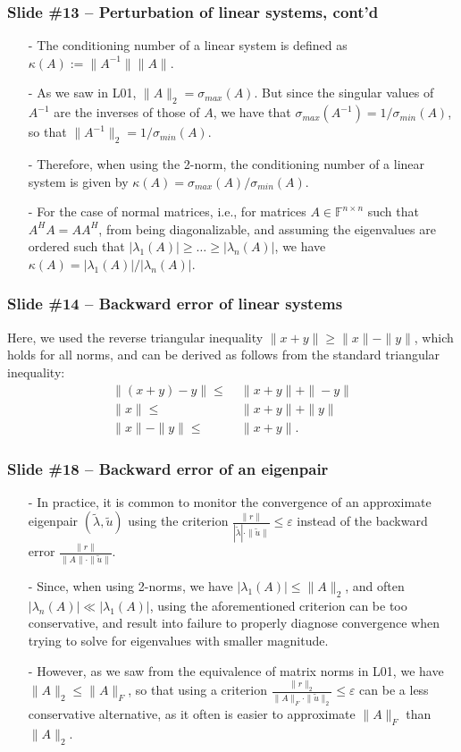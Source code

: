 \documentclass[letterpaper,10pt]{article}
\begin{document}
\subsubsection*{Slide \#13 -- Perturbation of linear systems, cont'd}
\begin{itemize}
\item[-] The conditioning number of a linear system is defined as $\kappa(A):=\|A^{-1}\|\|A\|$.
\item[-] As we saw in L01, $\|A\|_2=\sigma_{max}(A)$.
But since the singular values of $A^{-1}$ are the inverses of those of $A$, we have that $\sigma_{max}(A^{-1})=1/\sigma_{min}(A)$, so that $\|A^{-1}\|_2=1/\sigma_{min}(A)$.
\item[-] Therefore, when using the 2-norm, the conditioning number of a linear system is given by $\kappa(A)=\sigma_{max}(A)/\sigma_{min}(A)$.
\item[-] For the case of normal matrices, i.e., for matrices $A\in\mathbb{F}^{n\times n}$ such that $A^HA=AA^H$, from being diagonalizable, and assuming the eigenvalues are ordered such that $|\lambda_1(A)|\geq\dots\geq|\lambda_{n}(A)|$, we have $\kappa(A)=|\lambda_{1}(A)|/|\lambda_{n}(A)|$.
\end{itemize}

\subsubsection*{Slide \#14 -- Backward error of linear systems}
Here, we used the reverse triangular inequality $\|x+y\|\geq\|x\|-\|y\|$, which holds for all norms, and can be derived as follows from the standard triangular inequality:
\begin{align*}
\|(x+y)-y\|\leq&\;\|x+y\|+\|-y\|\\
\|x\|\leq&\;\|x+y\|+\|y\|\\
\|x\|-\|y\|\leq&\;\|x+y\|.
\end{align*}

\subsubsection*{Slide \#18 -- Backward error of an eigenpair}
\begin{itemize}
\item[-] In practice, it is common to monitor the convergence of an approximate eigenpair $(\tilde{\lambda},\tilde{u})$ using the criterion
$\displaystyle \frac{\|r\|}{|\tilde{\lambda}|\cdot\|\tilde{u}\|}\leq \varepsilon$ instead of the backward error $\displaystyle \frac{\|r\|}{\|A\|\cdot\|\tilde{u}\|}$.
\item[-] Since, when using 2-norms, we have $|\lambda_{1}(A)|\leq \|A\|_2$, and often $|\lambda_{n}(A)|\ll |\lambda_{1}(A)|$, using the aforementioned criterion can be too conservative, and result into failure to properly diagnose convergence when trying to solve for eigenvalues with smaller magnitude.
\item[-] However, as we saw from the equivalence of matrix norms in L01, we have $\|A\|_2\leq \|A\|_F$, so that using a criterion $\displaystyle \frac{\|r\|_2}{\|A\|_F\cdot\|\tilde{u}\|_2}\leq \varepsilon$ can be a less conservative alternative, as it often is easier to approximate $\|A\|_F$ than $\|A\|_2$.
\end{itemize}
\end{document}
